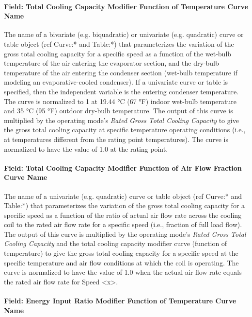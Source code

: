 \paragraph{Field: Total Cooling Capacity Modifier Function of Temperature Curve Name}

The name of a bivariate (e.g. biquadratic) or univariate (e.g. quadratic) curve or table object (ref Curve:* and Table:*) that parameterizes the variation of the gross total cooling capacity for a specific speed as a function of the wet-bulb temperature of the air entering the evaporator section, and the dry-bulb temperature of the air entering the condenser section (wet-bulb temperature if modeling an evaporative-cooled condenser). If a univariate curve or table is specified, then the independent variable is the entering condenser temperature. The curve is normalized to 1 at 19.44 °C (67 °F) indoor wet-bulb temperature and 35 °C (95 °F) outdoor dry-bulb temperature. The output of this curve is multiplied by the operating mode's \textit{Rated Gross Total Cooling Capacity} to give the gross total cooling capacity at specific temperature operating conditions (i.e., at temperatures different from the rating point temperatures). The curve is normalized to have the value of 1.0 at the rating point.

\paragraph{Field: Total Cooling Capacity Modifier Function of Air Flow Fraction Curve Name}\label{field-total-cooling-capacity-function-of-air-flow-fraction-curve-name}

The name of a univariate (e.g. quadratic) curve or table object (ref Curve:* and Table:*) that parameterizes the variation of the gross total cooling capacity for a specific speed as a function of the ratio of actual air flow rate across the cooling coil to the rated air flow rate for a specific speed (i.e., fraction of full load flow). The output of this curve is multiplied by the operating mode's \textit{Rated Gross Total Cooling Capacity} and the total cooling capacity modifier curve (function of temperature) to give the gross total cooling capacity for a specific speed at the specific temperature and air flow conditions at which the coil is operating. The curve is normalized to have the value of 1.0 when the actual air flow rate equals the rated air flow rate for Speed \textless{}x\textgreater{}.

\paragraph{Field: Energy Input Ratio Modifier Function of Temperature Curve Name}

